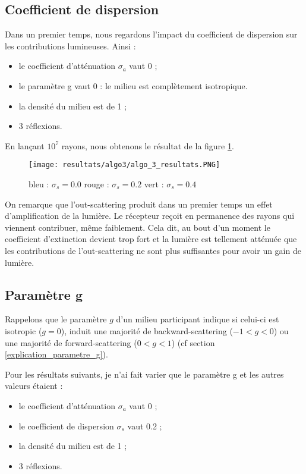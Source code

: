 \subsection{Coefficient de dispersion}

Dans un premier temps, nous regardons l'impact du coefficient de dispersion sur les contributions lumineuses. Ainsi :
\begin{itemize}
    \item le coefficient d'atténuation $\sigma_a$ vaut 0 ;
    \item le paramètre g vaut 0 : le milieu est complètement isotropique.
    \item la densité du milieu est de 1 ;
    \item 3 réflexions.
\end{itemize}
\vspace{1em}\par

En lançant $10^7$ rayons, nous obtenons le résultat de la figure \ref{fig:resultats_algo3_dispersion}.\newline

\begin{figure}[h!]
\centering
\texttt{[image: resultats/algo3/algo\_3\_resultats.PNG]}
\caption{
bleu : $\sigma_s = 0.0$ \qquad
rouge : $\sigma_s = 0.2$ \qquad
vert : $\sigma_s = 0.4$}
\label{fig:resultats_algo3_dispersion}
\end{figure}

On remarque que l'out-scattering produit dans un premier temps un effet d'amplification de la lumière. Le récepteur reçoit en permanence des rayons qui viennent contribuer, même faiblement. Cela dit, au bout d'un moment le coefficient d'extinction devient trop fort et la lumière est tellement atténuée que les contributions de l'out-scattering ne sont plus suffisantes pour avoir un gain de lumière.

\subsection{Paramètre g}

Rappelons que le paramètre $g$ d'un milieu participant indique si celui-ci est isotropic ($g = 0$), induit une majorité de backward-scattering ($-1 < g < 0$) ou une majorité de forward-scattering ($0 < g < 1$) (cf section \ref{explication_parametre_g}).\par
Pour les résultats suivants, je n'ai fait varier que le paramètre g et les autres valeurs étaient :
\begin{itemize}
    \item le coefficient d'atténuation $\sigma_a$ vaut 0 ;
    \item le coefficient de dispersion $\sigma_s$ vaut 0.2 ;
    \item la densité du milieu est de 1 ;
    \item 3 réflexions.
\end{itemize}

